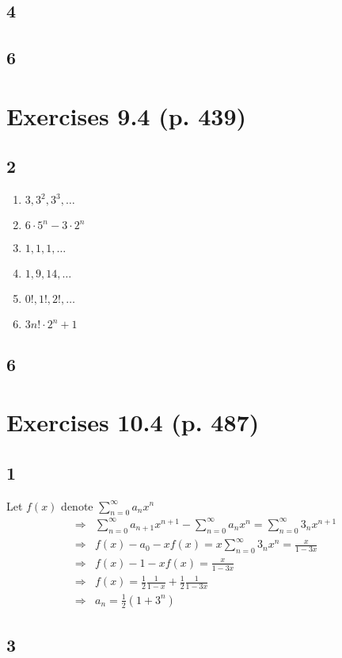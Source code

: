 \documentclass[a4paper]{article}
\begin{document}
\subsection{4}
\subsection{6}

\section{Exercises 9.4 (p. 439)  }
\subsection{2}
\begin{enumerate}[label=(\alph*)]
    \item $3,3^2,3^3,\ldots$
    \item $6\cdot 5^n - 3\cdot 2^n$
    \item $1, 1, 1,\ldots$
    \item $1,9,14,\ldots$
    \item $0!, 1!, 2!, \ldots$
    \item $3n!\cdot 2^n + 1$
\end{enumerate}

\subsection{6}

\section{Exercises 10.4 (p. 487) }
\subsection{1}
Let $f(x)$ denote $\sum_{n=0}^{\infty}{a_nx^n}$
\begin{align*}
\Rightarrow&\sum_{n=0}^{\infty}{a_{n+1}x^{n+1}} - \sum_{n=0}^{\infty}{a_nx^n} = \sum_{n=0}^{\infty}{3_nx^{n+1}}\\
\Rightarrow& f(x)-a_0-xf(x)=x\sum_{n=0}^{\infty}{3_nx^{n}}=\frac{x}{1-3x}\\
\Rightarrow& f(x)-1-xf(x)=\frac{x}{1-3x}\\
\Rightarrow&f(x)=\frac{1}{2}\frac{1}{1-x}+\frac{1}{2}\frac{1}{1-3x}\\
\Rightarrow&a_n=\frac{1}{2}(1+3^n)
\end{align*}
\subsection{3}
\end{document}

